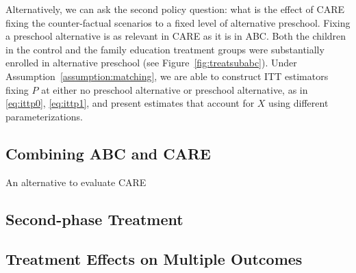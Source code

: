 \noindent Alternatively, we can ask the second policy question: what is the effect of CARE fixing the counter-factual scenarios to a fixed level of alternative preschool. Fixing a preschool alternative is as relevant in CARE as it is in ABC. Both the children in the control and the family education treatment groups were substantially enrolled in alternative preschool (see Figure~\ref{fig:treatsubabc}). Under Assumption~\ref{assumption:matching}, we are able to construct ITT estimators fixing $P$ at either no preschool alternative or preschool alternative, as in \eqref{eq:ittp0}, \eqref{eq:ittp1}, and present estimates that account for $X$ using different parameterizations.\\

\subsection{Combining ABC and CARE}

\noindent An alternative to evaluate CARE

\subsection{Second-phase Treatment}

\subsection{Treatment Effects on Multiple Outcomes}

\clearpage
\singlespace



 